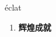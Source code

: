 
\begin{frame}
{\huge éclat}
\begin{center}
\begin{enumerate}\Large
  \item \textbf{辉煌成就}
\end{enumerate}
\end{center}
\end{frame}

